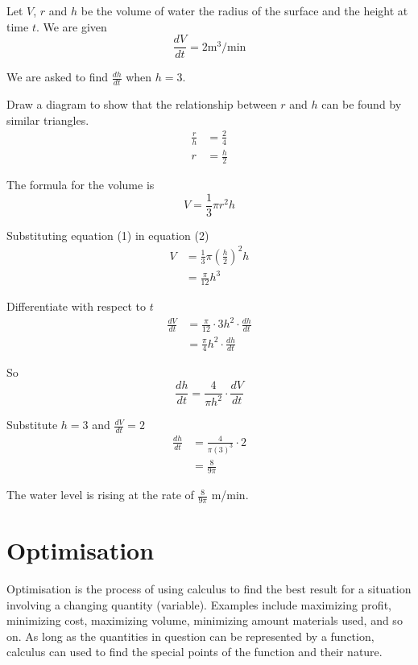 \begin{multicols}{2}
\solution Let $V$, $r$ and $h$ be the volume of water the radius of the surface and the height at time $t$. We are given
\begin{equation*}\frac{d V}{d t} =2\text{}\mathrm{m}^{3}/\mbox{min}
\end{equation*}

We are asked to find $\frac{d h}{d t}$ when $h =3$. 

Draw a diagram to show that the relationship between $r$ and $h$ can be found by similar triangles.
\begin{align}\frac{r}{h} &  = \frac{2}{4} \nonumber  \\
r &  = \frac{h}{2} \tag{1}\end{align}

The formula for the volume is
\begin{equation}V =\frac{1}{3} \pi  r^{2} h\tag{2}
\end{equation}

Substituting equation (1) in equation (2)
\begin{align*}V &  = \frac{1}{3} \pi  \genfrac{(}{)}{}{}{h}{2}^{2} h \\
 &  = \frac{\pi }{12} h^{3}\end{align*}

Differentiate with respect to $t$
\begin{align*}\frac{d V}{d t} &  = \frac{\pi }{12} \cdot 3 h^{2} \cdot \frac{d h}{d t} \\
 &  = \frac{\pi }{4} h^{2} \cdot \frac{d h}{d t}\end{align*}

So
\begin{equation*}\frac{d h}{d t} =\frac{4}{\pi  h^{2}} \cdot \frac{d V}{d t}
\end{equation*}

Substitute $h =3$ and $\frac{d V}{d t} =2$
\begin{align*}\frac{d h}{d t} &  = \frac{4}{\pi  \left (3\right )^{3}} \cdot 2 \\
 &  = \frac{8}{9 \pi }\end{align*}

The water level is rising at the rate of $\frac{8}{9 \pi }$ $\mbox{m}$/$\mbox{min}$. 
\end{multicols}


\section{Optimisation}\label{sec:Optimisation}
Optimisation is the process of using calculus to find the best result for a situation involving a changing quantity (variable). Examples include  maximizing profit, minimizing cost, maximizing volume, minimizing amount materials used, and so on. As long as the quantities in question can be represented by a function, calculus can used to find the special points of the function and their nature.


